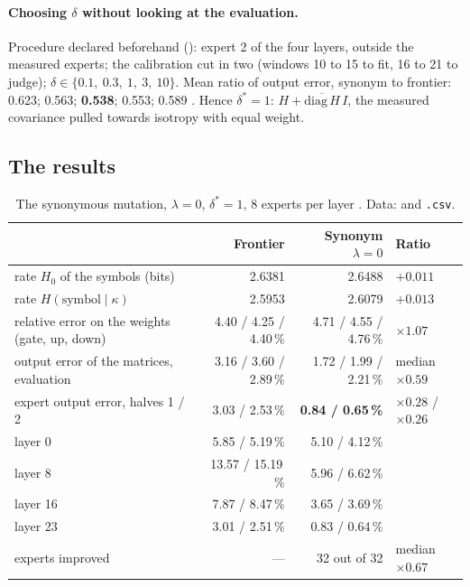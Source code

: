 \paragraph{Choosing $\delta$ without looking at the evaluation.} Procedure declared beforehand (): expert 2 of the four layers, outside the measured experts; the calibration cut in two (windows 10 to 15 to fit, 16 to 21 to judge); $\delta \in \{0.1,\ 0.3,\ 1,\ 3,\ 10\}$. Mean ratio of output error, synonym to frontier: 0.623; 0.563; \textbf{0.538}; 0.553; 0.589 \mes. Hence $\delta^\ast = 1$: $H + \overline{\mathrm{diag}\,H}\, I$, the measured covariance pulled towards isotropy with equal weight.

\subsection{The results}

\begin{table}[tbp]
\centering\small
\begin{tabular}{l r r l}
\toprule
& Frontier & Synonym $\lambda = 0$ & Ratio \\
\midrule
rate $H_0$ of the symbols (bits) & 2.6381 & 2.6488 & $+0.011$ \\
rate $H(\text{symbol}\mid\kappa)$ & 2.5953 & 2.6079 & $+0.013$ \\
relative error on the weights (gate, up, down) & 4.40 / 4.25 / 4.40\,\% & 4.71 / 4.55 / 4.76\,\% & $\times 1.07$ \\
output error of the matrices, evaluation & 3.16 / 3.60 / 2.89\,\% & 1.72 / 1.99 / 2.21\,\% & median $\times 0.59$ \\
expert output error, halves 1 / 2 & 3.03 / 2.53\,\% & \textbf{0.84 / 0.65\,\%} & $\times 0.28$ / $\times 0.26$ \\
\quad layer 0 & 5.85 / 5.19\,\% & 5.10 / 4.12\,\% & \\
\quad layer 8 & 13.57 / 15.19\,\% & 5.96 / 6.62\,\% & \\
\quad layer 16 & 7.87 / 8.47\,\% & 3.65 / 3.69\,\% & \\
\quad layer 23 & 3.01 / 2.51\,\% & 0.83 / 0.64\,\% & \\
experts improved & --- & 32 out of 32 & median $\times 0.67$ \\
\bottomrule
\end{tabular}
\caption[The synonymous mutation without entropy constraint]{The synonymous mutation, $\lambda = 0$, $\delta^\ast = 1$, 8 experts per layer \mes. Data:  and \texttt{.csv}.}
\label{t3ecl:tab:lam0}
\end{table}

